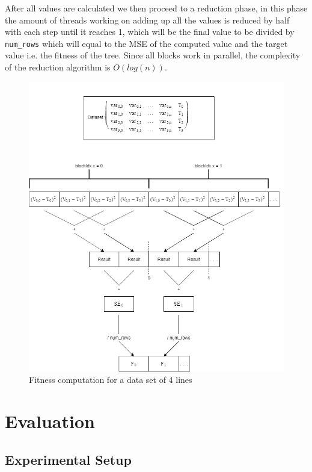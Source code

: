 \documentclass[runningheads]{llncs}
\begin{document}
After all values are calculated we then proceed to a reduction phase, in this phase the amount of threads working on adding up all the values is reduced by half with each step until it reaches 1, which will be the final value to be divided by \texttt{num\_rows} which will equal to the MSE of the computed value and the target value i.e. the fitness of the tree. Since all blocks work in parallel, the complexity of the reduction algorithm is $O(log(n))$.


\begin{figure}[!htb]
\begin{center}
\includegraphics[scale=0.35]{Fitness_Calculation1}
\end{center}
\caption{Fitness computation for a data set of 4 lines}
\label{fitness_calc}
\end{figure}

\section{Evaluation}

\subsection{Experimental Setup}
\end{document}
